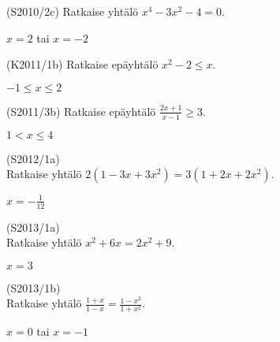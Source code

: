 \begin{tehtava}
(S2010/2c) Ratkaise yhtälö $x^4-3x^2-4=0$.
\begin{vastaus}
$x=2$ tai $x=-2$
\end{vastaus}
\end{tehtava}


\begin{tehtava}
(K2011/1b) Ratkaise epäyhtälö $x^2-2 \leq x$.
\begin{vastaus}
$-1 \leq x \leq 2$
\end{vastaus}
\end{tehtava}

\begin{tehtava}
  (S2011/3b) Ratkaise epäyhtälö $\frac{2x+1}{x-1} \geq 3$.
\begin{vastaus}
$1<x \leq 4$
\end{vastaus}
\end{tehtava}

\begin{tehtava}
(S2012/1a) \\ Ratkaise yhtälö $2(1-3x+3x^2) = 3(1+2x+2x^2)$.
\begin{vastaus}
$x=-\frac{1}{12}$
\end{vastaus}
\end{tehtava}

\begin{tehtava}
(S2013/1a) \\ Ratkaise yhtälö $x^2+6x=2x^2+9$.
\begin{vastaus}
$x=3$
\end{vastaus}
\end{tehtava}

\begin{tehtava}
(S2013/1b) \\ Ratkaise yhtälö $\frac{1+x}{1-x}=\frac{1-x^2}{1+x^2}$.
\begin{vastaus}
$x=0$ tai $x=-1$
\end{vastaus}
\end{tehtava}


